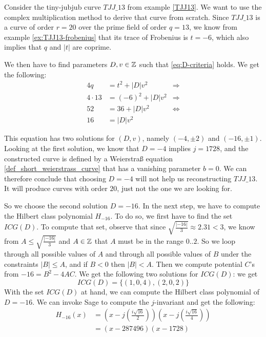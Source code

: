 \begin{example} Consider the tiny-jubjub curve $\mathit{TJJ\_13}$ from example \ref{TJJ13}. We want to use the complex multiplication method to derive that curve from scratch. Since $\mathit{TJJ\_13}$ is a curve of order $r=20$ over the prime field of order $q=13$, we know from example \ref{ex:TJJ13-frobenius} that its trace of Frobenius is $t=-6$, which also implies that $q$ and $|t|$ are coprime. 

We then have to find parameters $D,v\in\mathbb{Z}$ such that \ref{eq:D-criteria} holds. We get the following:
\begin{align*}
4q & = t^2+ |D|v^2 & \Rightarrow \\
4\cdot 13 & = (-6)^2+ |D|v^2 & \Rightarrow \\
52 & = 36 + |D|v^2 & \Leftrightarrow \\
16 & = |D|v^2
\end{align*}

This equation has two solutions for $(D,v)$, namely $(-4,\pm 2)$ and $(-16,\pm 1)$. Looking at the first solution, we know that  $D=-4$ implies $j=1728$, and the constructed curve is defined by a Weierstraß equation \ref{def_short_weierstrass_curve} that has a vanishing parameter $b=0$. We can therefore conclude that choosing $D=-4$ will not help us reconstructing $\mathit{TJJ\_13}$. It will produce curves with order $20$, just not the one we are looking for.

So we choose the second solution $D=-16$. In the next step, we have to compute the Hilbert class polynomial $H_{-16}$. To do so, we first have to find the set $ICG(D)$. To compute that set, observe that since $\sqrt{\frac{|-16|}{3}}\approx 2.31<3$, we know from $A\leq \sqrt{\frac{|-16|}{3}}$ and $A\in\mathbb{Z}$ that $A$ must be in the range $0..2$. So we loop through all possible values of $A$ and through all possible values of $B$ under the constraints $|B|\leq A$, and if $B<0$ then $|B|<A$.
Then we compute potential $C$'s from $-16 = B^2 -4AC$. We get the following two solutions for $ICG(D)$:
we get
$$
ICG(D)=\{(1,0,4),(2,0,2)\}
$$
With the set $ICG(D)$ at hand, we can compute the Hilbert class polynomial of $D=-16$. We can invoke Sage to compute the $j$-invariant and get the following:
\begin{align*}
H_{-16}(x) &= \left(x - j\left(\frac{i\sqrt{16}}{2}\right)\right)
 \left(x - j\left(\frac{i\sqrt{16}}{4}\right)\right) \\
           &= (x- 287496)(x-1728)
\end{align*}


\end{example}
